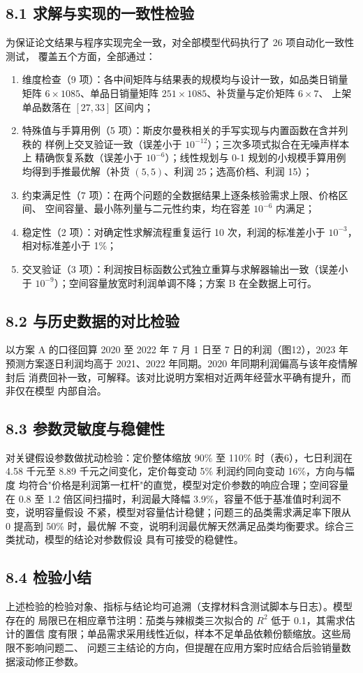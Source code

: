 
\subsection{8.1 求解与实现的一致性检验}

为保证论文结果与程序实现完全一致，对全部模型代码执行了 26 项自动化一致性测试，
覆盖五个方面，全部通过：

\begin{enumerate}[label=（\arabic*）]
\item 维度检查（9 项）：各中间矩阵与结果表的规模均与设计一致，如品类日销量矩阵
      $6\times1085$、单品日销量矩阵 $251\times1085$、补货量与定价矩阵 $6\times7$、
      上架单品数落在 $[27,33]$ 区间内；
\item 特殊值与手算用例（5 项）：斯皮尔曼秩相关的手写实现与内置函数在含并列秩的
      样例上交叉验证一致（误差小于 $10^{-12}$）；三次多项式拟合在无噪声样本上
      精确恢复系数（误差小于 $10^{-6}$）；线性规划与 0-1 规划的小规模手算用例
      均得到手推最优解（补货 $(5,5)$、利润 25；选高价档、利润 15）；
\item 约束满足性（7 项）：在两个问题的全数据结果上逐条核验需求上限、价格区间、
      空间容量、最小陈列量与二元性约束，均在容差 $10^{-6}$ 内满足；
\item 稳定性（2 项）：对确定性求解流程重复运行 10 次，利润的标准差小于 $10^{-3}$，
      相对标准差小于 1\%；
\item 交叉验证（3 项）：利润按目标函数公式独立重算与求解器输出一致（误差小于
      $10^{-9}$）；空间容量放宽时利润单调不降；方案 B 在全数据上可行。
\end{enumerate}

\subsection{8.2 与历史数据的对比检验}

以方案 A 的口径回算 2020 至 2022 年 7 月 1 日至 7 日的利润（图12），2023 年
预测方案逐日利润均高于 2021、2022 年同期。2020 年同期利润偏高与该年疫情解封后
消费回补一致，可解释。该对比说明方案相对近两年经营水平确有提升，而非仅在模型
内部自洽。

\subsection{8.3 参数灵敏度与稳健性}

对关键假设参数做扰动检验：定价整体缩放 90\% 至 110\% 时（表6），七日利润在
4.58 千元至 8.89 千元之间变化，定价每变动 5\% 利润约同向变动 16\%，方向与幅度
均符合"价格是利润第一杠杆"的直觉，模型对定价参数的响应合理；空间容量在 0.8 至
1.2 倍区间扫描时，利润最大降幅 3.9\%，容量不低于基准值时利润不变，说明容量假设
不紧，模型对容量估计稳健；问题三的品类需求满足率下限从 0 提高到 50\% 时，最优解
不变，说明利润最优解天然满足品类均衡要求。综合三类扰动，模型的结论对参数假设
具有可接受的稳健性。

\subsection{8.4 检验小结}

上述检验的检验对象、指标与结论均可追溯（支撑材料含测试脚本与日志）。模型存在的
局限已在相应章节注明：茄类与辣椒类三次拟合的 $R^2$ 低于 0.1，其需求估计的置信
度有限；单品需求采用线性近似，样本不足单品依赖份额缩放。这些局限不影响问题二、
问题三主结论的方向，但提醒在应用方案时应结合后验销量数据滚动修正参数。
